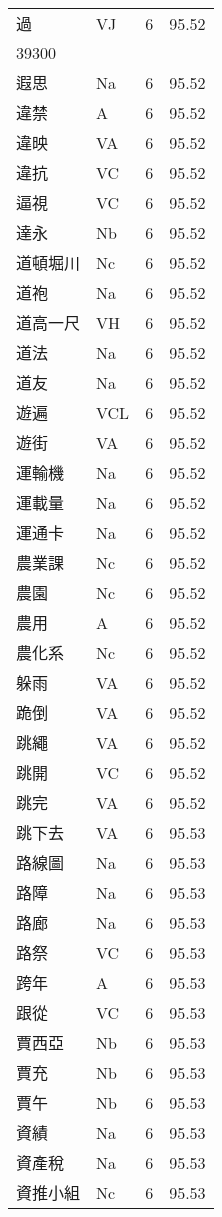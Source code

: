 \documentclass[twocolumn]{book}
\begin{document}
\begin{supertabular}{llrr}
過 & VJ & 6 &  95.52\\
39300\\
遐思 & Na & 6 &  95.52\\
違禁 & A & 6 &  95.52\\
違映 & VA & 6 &  95.52\\
違抗 & VC & 6 &  95.52\\
逼視 & VC & 6 &  95.52\\
達永 & Nb & 6 &  95.52\\
道頓堀川 & Nc & 6 &  95.52\\
道袍 & Na & 6 &  95.52\\
道高一尺 & VH & 6 &  95.52\\
道法 & Na & 6 &  95.52\\
道友 & Na & 6 &  95.52\\
遊遍 & VCL & 6 &  95.52\\
遊街 & VA & 6 &  95.52\\
運輸機 & Na & 6 &  95.52\\
運載量 & Na & 6 &  95.52\\
運通卡 & Na & 6 &  95.52\\
農業課 & Nc & 6 &  95.52\\
農園 & Nc & 6 &  95.52\\
農用 & A & 6 &  95.52\\
農化系 & Nc & 6 &  95.52\\
躲雨 & VA & 6 &  95.52\\
跪倒 & VA & 6 &  95.52\\
跳繩 & VA & 6 &  95.52\\
跳開 & VC & 6 &  95.52\\
跳完 & VA & 6 &  95.52\\
跳下去 & VA & 6 &  95.53\\
路線圖 & Na & 6 &  95.53\\
路障 & Na & 6 &  95.53\\
路廊 & Na & 6 &  95.53\\
路祭 & VC & 6 &  95.53\\
跨年 & A & 6 &  95.53\\
跟從 & VC & 6 &  95.53\\
賈西亞 & Nb & 6 &  95.53\\
賈充 & Nb & 6 &  95.53\\
賈午 & Nb & 6 &  95.53\\
資績 & Na & 6 &  95.53\\
資產稅 & Na & 6 &  95.53\\
資推小組 & Nc & 6 &  95.53\\

\end{supertabular}
\end{document}
